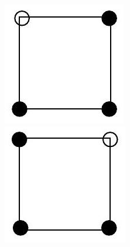 \documentclass[10pt]{article}
\begin{document}
\includegraphics[max width=\textwidth, center]{2025_09_05_3ba26226ec0baddb5a03g-50(15)}\\
\includegraphics[max width=\textwidth, center]{2025_09_05_3ba26226ec0baddb5a03g-50(2)}\\
\end{document}
